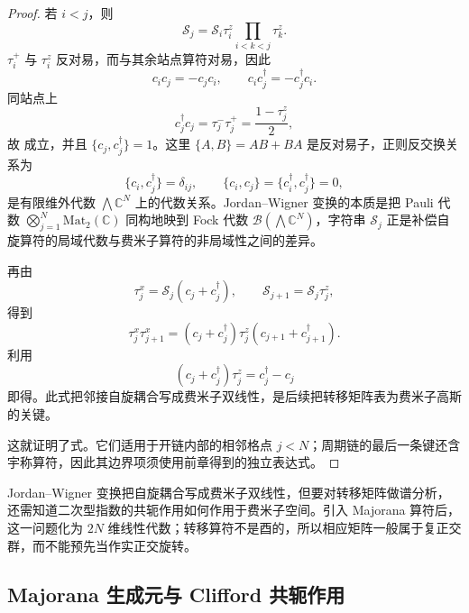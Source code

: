 \begin{proof}
若 \(i<j\)，则
\[
 \mathscr S_j
 =\mathscr S_i\tau_i^z
 \prod_{i<k<j}\tau_k^z.
\]
\(\tau_i^+\) 与 \(\tau_i^z\) 反对易，而与其余站点算符对易，因此
\[
 c_ic_j=-c_jc_i,
 \qquad
 c_ic_j^\dagger=-c_j^\dagger c_i.
\]
同站点上
\[
 c_j^\dagger c_j
 =\tau_j^-\tau_j^+
 =\frac{1-\tau_j^z}{2},
\]
故 成立，并且 \(\{c_j,c_j^\dagger\}=1\)。这里 \(\{A,B\}=AB+BA\) 是反对易子，正则反交换关系为
\begin{equation*}
 \{c_i,c_j^\dagger\}=\delta_{ij},
 \qquad
 \{c_i,c_j\}=\{c_i^\dagger,c_j^\dagger\}=0,
\end{equation*}
是有限维外代数 \(\bigwedge\mathbb C^N\) 上的代数关系。Jordan--Wigner 变换的本质是把 Pauli 代数 \(\bigotimes_{j=1}^N\mathrm{Mat}_2(\mathbb C)\) 同构地映到 Fock 代数 \(\mathcal B(\bigwedge\mathbb C^N)\)，字符串 \(\mathscr S_j\) 正是补偿自旋算符的局域代数与费米子算符的非局域性之间的差异。

再由
\[
 \tau_j^x=\mathscr S_j(c_j+c_j^\dagger),
 \qquad
 \mathscr S_{j+1}=\mathscr S_j\tau_j^z,
\]
得到
\[
 \tau_j^x\tau_{j+1}^x
 =(c_j+c_j^\dagger)\tau_j^z
 (c_{j+1}+c_{j+1}^\dagger).
\]
利用
\[
 (c_j+c_j^\dagger)\tau_j^z=c_j^\dagger-c_j
\]
即得。此式把邻接自旋耦合写成费米子双线性，是后续把转移矩阵表为费米子高斯的关键。

这就证明了式。它们适用于开链内部的相邻格点 \(j<N\)；周期链的最后一条键还含宇称算符，因此其边界项须使用前章得到的独立表达式。
\end{proof}

Jordan--Wigner 变换把自旋耦合写成费米子双线性，但要对转移矩阵做谱分析，还需知道二次型指数的共轭作用如何作用于费米子空间。引入 Majorana 算符后，这一问题化为 $2N$ 维线性代数；转移算符不是酉的，所以相应矩阵一般属于复正交群，而不能预先当作实正交旋转。

\subsection{Majorana 生成元与 Clifford 共轭作用}

